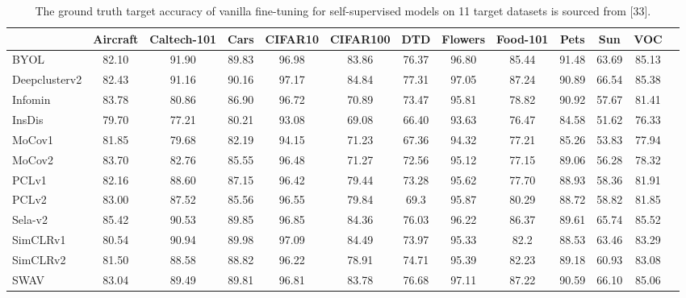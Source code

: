\begin{table*}\setlength\tabcolsep{5pt}
\footnotesize

    \centering
    \caption{The ground truth target accuracy of vanilla fine-tuning for self-supervised models on 11 target datasets is sourced from [33].}
    \label{tab:ground_truth-vanilla_ft}
    \begin{adjustbox}{max width=\textwidth}
        
    
    \begin{tabular}{lcccccccccccc}
        \toprule
        & Aircraft & Caltech-101 & Cars  & CIFAR10 & CIFAR100 & DTD   & Flowers & Food-101 & Pets  & Sun & VOC  \\
        \midrule
        BYOL & 82.10 & 91.90 & 89.83 & 96.98 & 83.86 & 76.37 & 96.80 & 85.44 & 91.48 & 63.69 & 85.13 \\
        Deepclusterv2 & 82.43 & 91.16 & 90.16 & 97.17 & 84.84 & 77.31 & 97.05 & 87.24 & 90.89 & 66.54 & 85.38 \\
        Infomin & 83.78 & 80.86 & 86.90 & 96.72 & 70.89 & 73.47 & 95.81 & 78.82 & 90.92 & 57.67 & 81.41 \\
        InsDis & 79.70 & 77.21 & 80.21 & 93.08 & 69.08 & 66.40 & 93.63 & 76.47 & 84.58 & 51.62 & 76.33 \\
        MoCov1 & 81.85 & 79.68 & 82.19 & 94.15 & 71.23 & 67.36 & 94.32 & 77.21 & 85.26 & 53.83 & 77.94 \\
        MoCov2 & 83.70 & 82.76 & 85.55 & 96.48 & 71.27 & 72.56 & 95.12 & 77.15 & 89.06 & 56.28 & 78.32 \\
        PCLv1 & 82.16 & 88.60 & 87.15 & 96.42 & 79.44 & 73.28 & 95.62 & 77.70 & 88.93 & 58.36 & 81.91 \\
        PCLv2 & 83.00 & 87.52 & 85.56 & 96.55 & 79.84 & 69.3 & 95.87 & 80.29 & 88.72 & 58.82 & 81.85 \\
        Sela-v2 & 85.42 & 90.53 & 89.85 & 96.85 & 84.36 & 76.03 & 96.22 & 86.37 & 89.61 & 65.74 & 85.52 \\
        SimCLRv1 & 80.54 & 90.94 & 89.98 & 97.09 & 84.49 & 73.97 & 95.33 & 82.2 & 88.53 & 63.46 & 83.29 \\
        SimCLRv2 & 81.50 & 88.58 & 88.82 & 96.22 & 78.91 & 74.71 & 95.39 & 82.23 & 89.18 & 60.93 & 83.08 \\
        SWAV & 83.04 & 89.49 & 89.81 & 96.81 & 83.78 & 76.68 & 97.11 & 87.22 & 90.59 & 66.10 & 85.06 \\
        \bottomrule
    \end{tabular}
    \end{adjustbox}
\end{table*}


